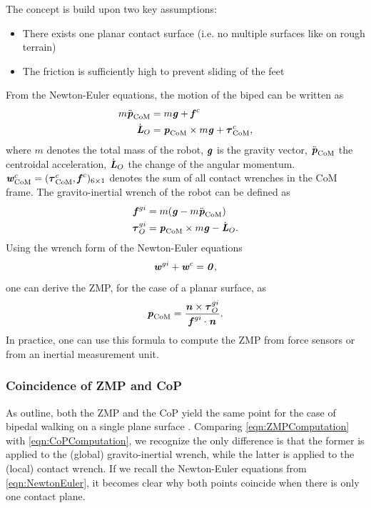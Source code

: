 The concept is build upon two key assumptions:
\begin{itemize}
\item There exists one planar contact surface (i.e. no multiple surfaces like on rough terrain)
\item The friction is sufficiently high to prevent sliding of the feet
\end{itemize}
From the Newton-Euler equations, the motion of the biped can be written as
\begin{align*}
m\ddot{\bm{\mathit{p}}}_{\text{CoM}} &= m\bm{\mathit{g}}+\bm{\mathit{f}}^c \\
\dot{\bm{\mathit{L}}}_O &= \bm{\mathit{p}}_{\text{CoM}}\times m\bm{\mathit{g}}+\bm{\mathit{\tau}}_{\text{CoM}}^c,
\end{align*}
where $m$ denotes the total mass of the robot, $\bm{\mathit{g}}$ is the gravity vector, $\ddot{\bm{\mathit{p}}}_{\text{CoM}}$ the centroidal acceleration, $\dot{\bm{\mathit{L}}}_O$ the change of the angular momentum. $\bm{\mathit{w}}_{\text{CoM}}^c=(\bm{\mathit{\tau}}_{\text{CoM}}^c, \bm{\mathit{f}}^c)_{6\times 1}$ denotes the sum of all contact wrenches in the \gls{CoM} frame. The gravito-inertial wrench of the robot can be defined as
\begin{align*}
\bm{\mathit{f}}^{gi} &= m(\bm{\mathit{g}}-m\ddot{\bm{\mathit{p}}}_{\text{CoM}}) \\
\bm{\mathit{\tau}}_O^{gi} &= \bm{\mathit{p}}_{\text{CoM}}\times m\bm{\mathit{g}}-\dot{\bm{\mathit{L}}}_O.
\end{align*}
Using the wrench form of the Newton-Euler equations
\begin{equation}\label{eqn:NewtonEuler} 
\bm{\mathit{w}}^{gi}+\bm{\mathit{w}}^c=\bm{\mathit{0}},
\end{equation}
one can derive the \gls{ZMP}, for the case of a planar surface, as
\begin{equation}\label{eqn:ZMPComputation}
\bm{\mathit{p}}_{\text{CoM}}=\dfrac{\bm{\mathit{n}}\times\bm{\mathit{\tau}}_O^{gi}}{\bm{\mathit{f}}^{gi}\cdot\bm{\mathit{n}}}.
\end{equation}
In practice, one can use this formula to compute the \gls{ZMP} from force sensors or from an inertial measurement unit. 
\subsubsection{Coincidence of ZMP and CoP}
As \citeauthor{sardain2004forces} outline, both the \gls{ZMP} and the \gls{CoP} yield the same point for the case of bipedal walking on a single plane surface \cite{sardain2004forces}. Comparing \cref{eqn:ZMPComputation} with \cref{eqn:CoPComputation}, we recognize the only difference is that the former is applied to the (global) gravito-inertial wrench, while the latter is applied to the (local) contact wrench. If we recall the Newton-Euler equations from \cref{eqn:NewtonEuler}, it becomes clear why both points coincide when there is only one contact plane.

